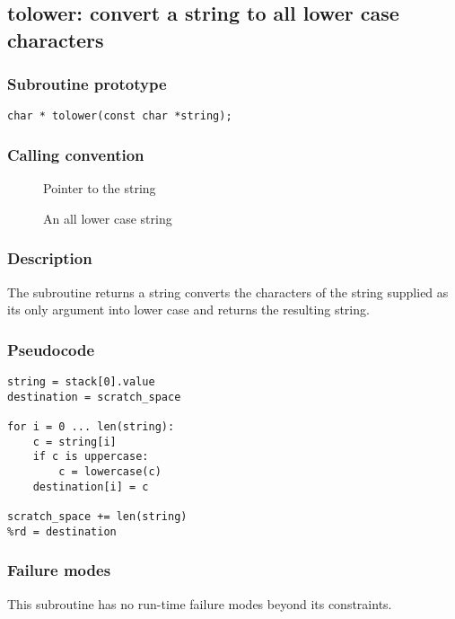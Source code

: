 \clearpage
{}
{}
\label{subr:tolower}
\subsection*{tolower: convert a string to all lower case characters}

\subsubsection*{Subroutine prototype}

\begin{verbatim}
char * tolower(const char *string);
\end{verbatim}

\subsubsection*{Calling convention}

\begin{description}
\item[] Pointer to the string
\item[] An all lower case string
\end{description}

\subsubsection*{Description}

The  subroutine returns a string converts the
characters of the string supplied as its only argument into lower case
and returns the resulting string.

\subsubsection*{Pseudocode}

\begin{verbatim}
string = stack[0].value
destination = scratch_space

for i = 0 ... len(string):
    c = string[i]
    if c is uppercase:
        c = lowercase(c)
    destination[i] = c

scratch_space += len(string)
%rd = destination
\end{verbatim}

\subsubsection*{Failure modes}

This subroutine has no run-time failure modes beyond its constraints.
